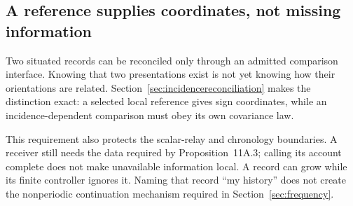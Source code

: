 \subsection*{A reference supplies coordinates, not missing information}
Two situated records can be reconciled only through an admitted comparison interface. Knowing that two presentations exist is not yet knowing how their orientations are related. Section~\ref{sec:incidencereconciliation} makes the distinction exact: a selected local reference gives sign coordinates, while an incidence-dependent comparison must obey its own covariance law.

This requirement also protects the scalar-relay and chronology boundaries. A receiver still needs the data required by Proposition~11A.3; calling its account complete does not make unavailable information local. A record can grow while its finite controller ignores it. Naming that record ``my history'' does not create the nonperiodic continuation mechanism required in Section~\ref{sec:frequency}.
\endgroup
\setcounter{section}{4}
